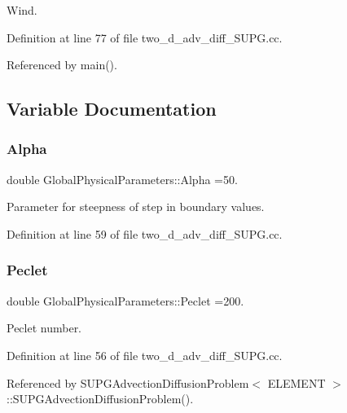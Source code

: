 Wind. 



Definition at line 77 of file two\+\_\+d\+\_\+adv\+\_\+diff\+\_\+\+S\+U\+P\+G.\+cc.



Referenced by main().



\subsection{Variable Documentation}
\mbox{\label{namespaceGlobalPhysicalParameters_aec7a344b74b10d835b331ef0dc6601da}} 
\subsubsection{\texorpdfstring{Alpha}{Alpha}}
{\footnotesize\ttfamily double Global\+Physical\+Parameters\+::\+Alpha =50.}



Parameter for steepness of step in boundary values. 



Definition at line 59 of file two\+\_\+d\+\_\+adv\+\_\+diff\+\_\+\+S\+U\+P\+G.\+cc.

\mbox{\label{namespaceGlobalPhysicalParameters_ab7011a8f93f2cbd3d45af00151aee3b2}} 
\subsubsection{\texorpdfstring{Peclet}{Peclet}}
{\footnotesize\ttfamily double Global\+Physical\+Parameters\+::\+Peclet =200.}



Peclet number. 



Definition at line 56 of file two\+\_\+d\+\_\+adv\+\_\+diff\+\_\+\+S\+U\+P\+G.\+cc.



Referenced by S\+U\+P\+G\+Advection\+Diffusion\+Problem$<$ E\+L\+E\+M\+E\+N\+T $>$\+::\+S\+U\+P\+G\+Advection\+Diffusion\+Problem().

